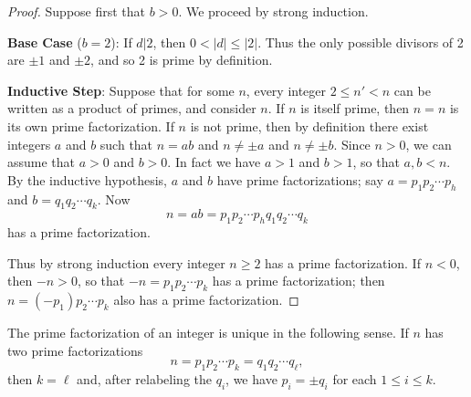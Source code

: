 \begin{proof}
Suppose first that \(b > 0\).
We proceed by strong induction.
\begin{proplist}
\item \textbf{Base Case} (\(b = 2\)): If \(d|2\), then \(0 < |d| \leq |2|\).
Thus the only possible divisors of 2 are \(\pm 1\) and \(\pm 2\), and so 2 is prime by definition.
\item \textbf{Inductive Step}: Suppose that for some \(n\), every integer \(2 \leq n' < n\) can be written as a product of primes, and consider \(n\).
If \(n\) is itself prime, then \(n = n\) is its own prime factorization.
If \(n\) is not prime, then by definition there exist integers \(a\) and \(b\) such that \(n = ab\) and \(n \neq \pm a\) and \(n \neq \pm b\).
Since \(n > 0\), we can assume that \(a > 0\) and \(b > 0\).
In fact we have \(a > 1\) and \(b > 1\), so that \(a,b < n\).
By the inductive hypothesis, \(a\) and \(b\) have prime factorizations; say \(a = p_1p_2 \cdots p_h\) and \(b = q_1q_2 \cdots q_k\).
Now \[ n = ab = p_1p_2 \cdots p_h q_1q_2 \cdots q_k \] has a prime factorization.
\end{proplist}
Thus by strong induction every integer \(n \geq 2\) has a prime factorization.
If \(n < 0\), then \(-n > 0\), so that \(-n = p_1p_2 \cdots p_k\) has a prime factorization; then \(n = (-p_1)p_2 \cdots p_k\) also has a prime factorization.
\end{proof}

\begin{thm}
The prime factorization of an integer is unique in the following sense.
If \(n\) has two prime factorizations \[ n = p_1p_2 \cdots p_k = q_1q_2 \cdots q_\ell, \] then \(k = \ell\) and, after relabeling the \(q_i\), we have \(p_i = \pm q_i\) for each \(1 \leq i \leq k\).
\end{thm}

